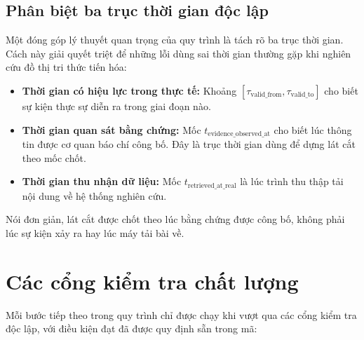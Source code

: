 \subsection{Phân biệt ba trục thời gian độc lập}
Một đóng góp lý thuyết quan trọng của quy trình là tách rõ ba trục thời gian. Cách này giải quyết triệt để những lỗi dùng sai thời gian thường gặp khi nghiên cứu đồ thị tri thức tiến hóa:
\begin{itemize}
    \item \textbf{Thời gian có hiệu lực trong thực tế:} Khoảng $[\tau_{\text{valid\_from}}, \tau_{\text{valid\_to}}]$ cho biết sự kiện thực sự diễn ra trong giai đoạn nào.
    \item \textbf{Thời gian quan sát bằng chứng:} Mốc $t_{\text{evidence\_observed\_at}}$ cho biết lúc thông tin được cơ quan báo chí công bố. Đây là trục thời gian dùng để dựng lát cắt theo mốc chốt.
    \item \textbf{Thời gian thu nhận dữ liệu:} Mốc $t_{\text{retrieved\_at\_real}}$ là lúc trình thu thập tải nội dung về hệ thống nghiên cứu.
\end{itemize}
Nói đơn giản, lát cắt được chốt theo lúc bằng chứng được công bố, không phải lúc sự kiện xảy ra hay lúc máy tải bài về.
\section{Các cổng kiểm tra chất lượng}
\label{sec:stage_gates}

Mỗi bước tiếp theo trong quy trình chỉ được chạy khi vượt qua các cổng kiểm tra độc lập, với điều kiện đạt đã được quy định sẵn trong mã:

